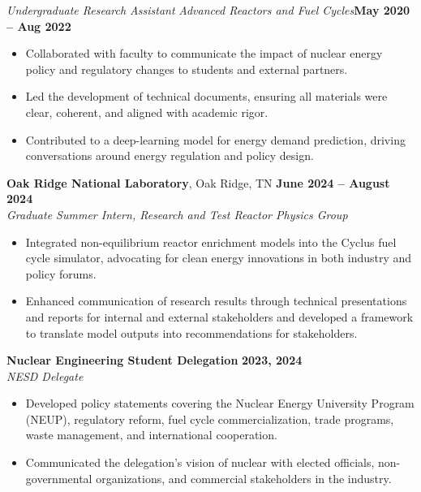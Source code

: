 \documentclass[margin,line]{resume}
\begin{document}
\begin{resume}
    \textsl{Undergraduate Research Assistant} \textsl{Advanced Reactors and Fuel Cycles}\hfill \textbf{May 2020 -- Aug 2022}\\
    \begin{itemize}
        \item Collaborated with faculty to communicate the impact of nuclear energy policy and regulatory changes to students and external partners.
        \item Led the development of technical documents, ensuring all materials were clear, coherent, and aligned with academic rigor.
        \item Contributed to a deep-learning model for energy demand prediction, driving conversations around energy regulation and policy design.
    \end{itemize}

    \textbf{Oak Ridge National Laboratory}, Oak Ridge, TN \hfill \textbf{June 2024 -- August 2024} \\
    \textsl{Graduate Summer Intern, Research and Test Reactor Physics Group} \\
    \begin{itemize}
        \item Integrated non-equilibrium reactor enrichment models into the Cyclus fuel cycle simulator, advocating for clean energy innovations in both industry and policy forums.
        \item Enhanced communication of research results through technical presentations and reports for internal and external stakeholders and developed a framework to translate model outputs into recommendations for stakeholders.
    \end{itemize}

    \textbf{Nuclear Engineering Student Delegation} \hfill \textbf{2023, 2024} \\
    \textsl{NESD Delegate} \\
    \begin{itemize}
        \item Developed policy statements covering the Nuclear Energy University Program (NEUP), regulatory reform, fuel cycle commercialization, trade programs, waste management, and international cooperation.
        \item Communicated the delegation's vision of nuclear with elected officials, non-governmental organizations, and commercial stakeholders in the industry.
    \end{itemize}
    \vspace{-4mm}

\end{resume}
\end{document}
